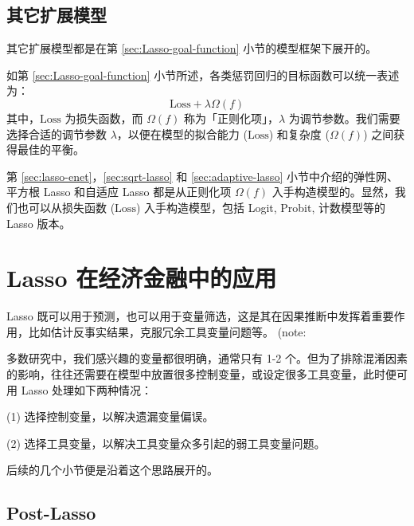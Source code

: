 
\subsection{其它扩展模型}

其它扩展模型都是在第 \ref{sec:Lasso-goal-function} 小节的模型框架下展开的。

如第 \ref{sec:Lasso-goal-function} 小节所述，各类惩罚回归的目标函数可以统一表述为：
\begin{equation}\label{eq:Lasso-08-a}
	\text{Loss}+\lambda \Omega(f)
\end{equation}
其中，$\text{Loss}$ 为损失函数，而 $\Omega(f)$ 称为「正则化项」，$\lambda$ 为调节参数。我们需要选择合适的调节参数 $\lambda$，以便在模型的拟合能力 ($\text{Loss}$) 和复杂度 ($\Omega(f)$) 之间获得最佳的平衡。

第 \ref{sec:lasso-enet}，\ref{sec:sqrt-lasso} 和  \ref{sec:adaptive-lasso} 小节中介绍的弹性网、平方根 Lasso 和自适应 Lasso 都是从正则化项 $\Omega(f)$ 入手构造模型的。显然，我们也可以从损失函数 ($\text{Loss}$) 入手构造模型，包括 Logit, Probit, 计数模型等的 Lasso 版本。 





\section{Lasso 在经济金融中的应用}\label{sec:lassoApp}
Lasso 既可以用于预测，也可以用于变量筛选，这是其在因果推断中发挥着重要作用，比如估计反事实结果，克服冗余工具变量问题等。 (note: %

多数研究中，我们感兴趣的变量都很明确，通常只有 1-2 个。但为了排除混淆因素的影响，往往还需要在模型中放置很多控制变量，或设定很多工具变量，此时便可用 Lasso 处理如下两种情况：


(1) 选择控制变量，以解决遗漏变量偏误。

(2) 选择工具变量，以解决工具变量众多引起的弱工具变量问题。



后续的几个小节便是沿着这个思路展开的。



\subsection{Post-Lasso}\label{sec:lasso-post-lasso}


